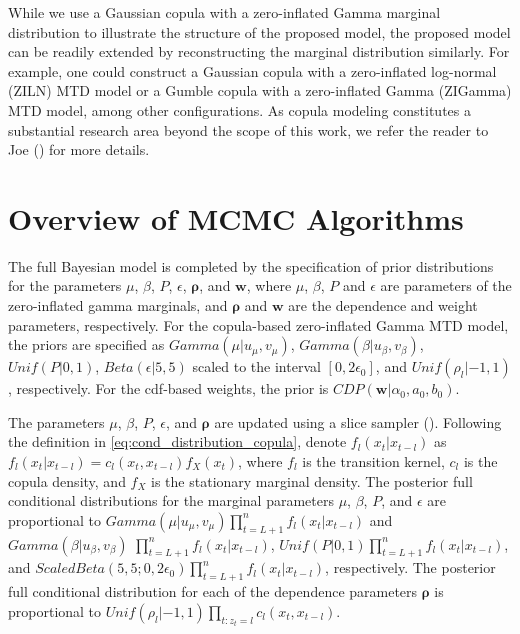\documentclass[
  letterpaper,
  double,
  12pt,
  1.0in]{beavtex}
\begin{document}
While we use a Gaussian copula with a zero-inflated Gamma marginal
distribution to illustrate the structure of the proposed model, the
proposed model can be readily extended by reconstructing the marginal
distribution similarly. For example, one could construct a Gaussian
copula with a zero-inflated log-normal (ZILN) MTD model or a Gumble
copula with a zero-inflated Gamma (ZIGamma) MTD model, among other
configurations. As copula modeling constitutes a substantial research
area beyond the scope of this work, we refer the reader to Joe
() for more details.

\chapter{Overview of MCMC Algorithms}\label{sec-ch2-comp}

The full Bayesian model is completed by the specification of prior
distributions for the parameters \(\mu\), \(\beta\), \(P\),
\(\epsilon\), \(\boldsymbol{\rho}\), and \(\boldsymbol{w}\), where
\(\mu\), \(\beta\), \(P\) and \(\epsilon\) are parameters of the
zero-inflated gamma marginals, and \(\boldsymbol{\rho}\) and
\(\boldsymbol{w}\) are the dependence and weight parameters,
respectively. For the copula-based zero-inflated Gamma MTD model, the
priors are specified as \(Gamma(\mu | u_{\mu}, v_{\mu})\),
\(Gamma(\beta | u_{\beta}, v_{\beta})\), \(Unif(P |0, 1)\),
\(Beta(\epsilon | 5, 5)\) scaled to the interval \([0, 2\epsilon_0]\),
and \(Unif(\rho_l |-1, 1)\), respectively. For the cdf-based weights,
the prior is \(CDP(\boldsymbol{w} | \alpha_0, a_0, b_0)\).

The parameters \(\mu\), \(\beta\), \(P\), \(\epsilon\), and
\(\boldsymbol{\rho}\) are updated using a slice sampler
(). Following the definition in
\eqref{eq:cond_distribution_copula}, denote \(f_l (x_t | x_{t-l})\) as
\(f_l (x_t | x_{t-l}) = c_l (x_t, x_{t-l}) f_X(x_t)\), where \(f_l\) is
the transition kernel, \(c_l\) is the copula density, and \(f_X\) is the
stationary marginal density. The posterior full conditional
distributions for the marginal parameters \(\mu\), \(\beta\), \(P\), and
\(\epsilon\) are proportional to
\(Gamma(\mu | u_{\mu}, v_{\mu}) \prod_{t=L+1}^n f_l (x_t | x_{t-l})\)
and \(Gamma(\beta | u_{\beta}, v_{\beta})\)
\(\prod_{t=L+1}^n f_l (x_t | x_{t-l})\),
\(Unif(P | 0, 1) \prod_{t=L+1}^n f_l (x_t | x_{t-l})\), and
\(ScaledBeta(5, 5; 0, 2\epsilon_0) \prod_{t=L+1}^n f_l (x_t | x_{t-l})\),
respectively. The posterior full conditional distribution for each of
the dependence parameters \(\boldsymbol{\rho}\) is proportional to
\(Unif(\rho_l |-1, 1) \prod_{t:z_t = l} c_l (x_t, x_{t-l})\).
\end{document}
